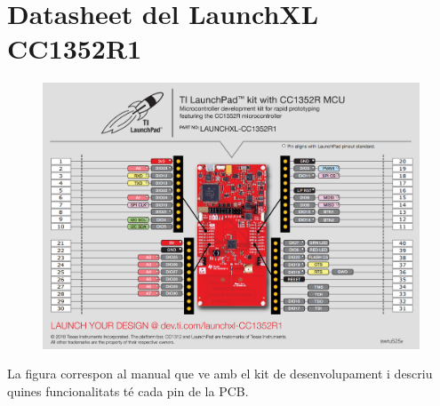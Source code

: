 \chapter{Datasheet del LaunchXL CC1352R1}
\label{datasheet}

\begin{figure}[h!]
	\begin{center}
		\includegraphics[width=\textwidth]{./images/pinout.PNG}
	\end{center}
\end{figure}

La figura correspon al manual que ve amb el kit de desenvolupament i descriu quines funcionalitats té cada pin de la PCB.